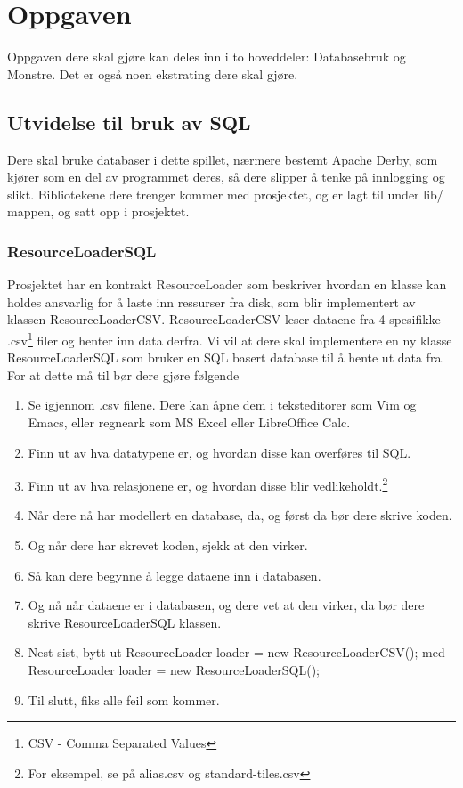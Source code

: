 \documentclass[norsk]{article}
\begin{document}
\section{Oppgaven}
Oppgaven dere skal gjøre kan deles inn i to hoveddeler: Databasebruk og Monstre. Det er også noen ekstrating dere skal gjøre.

\subsection{Utvidelse til bruk av SQL}
\label{subsec:sqloppgave}
Dere skal bruke databaser i dette spillet, nærmere bestemt Apache Derby, som kjører som en del av programmet deres, så dere slipper å tenke på innlogging og slikt. %
Bibliotekene dere trenger kommer med prosjektet, og er lagt til under lib/ mappen, og satt opp i prosjektet.

\subsubsection{ResourceLoaderSQL}
\label{subsec:resourceloadersql}
Prosjektet har en kontrakt ResourceLoader som beskriver hvordan en klasse kan holdes ansvarlig for å laste inn ressurser fra disk,
som blir implementert av klassen ResourceLoaderCSV.
ResourceLoaderCSV leser dataene fra 4 spesifikke .csv\footnote{CSV - Comma Separated Values} filer og henter inn data derfra.
Vi vil at dere skal implementere en ny klasse ResourceLoaderSQL som bruker en SQL basert database til å hente ut data fra.
For at dette må til bør dere gjøre følgende
\begin{enumerate}
\item Se igjennom .csv filene. Dere kan åpne dem i teksteditorer som Vim og Emacs, eller regneark som MS Excel eller LibreOffice Calc.
\item Finn ut av hva datatypene er, og hvordan disse kan overføres til SQL.
\item Finn ut av hva relasjonene er, og hvordan disse blir vedlikeholdt.\footnote{For eksempel, se på alias.csv og standard-tiles.csv}
\item Når dere nå har modellert en database, da, og først da bør dere skrive koden.
\item Og når dere har skrevet koden, sjekk at den virker.
\item Så kan dere begynne å legge dataene inn i databasen.
\item Og nå når dataene er i databasen, og dere vet at den virker, da bør dere skrive ResourceLoaderSQL klassen.
\item Nest sist, bytt ut ResourceLoader loader = new ResourceLoaderCSV(); med ResourceLoader loader = new ResourceLoaderSQL();
\item Til slutt, fiks alle feil som kommer.
\end{enumerate}
\end{document}
